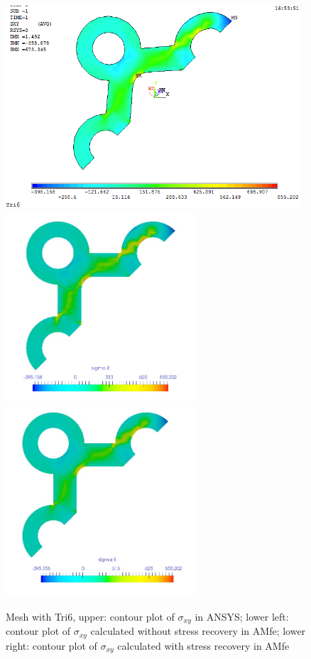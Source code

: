 \begin{figure}[htbp]
	\begin{center}
		\includegraphics[width=11cm,clip]{Tri6_Sxy.png} 		
		\includegraphics[width=7cm,clip]{Tri6_Sxy_PD.png} 		
		\includegraphics[width=7cm,clip]{Tri6_Sxy_P.png} 		
		\caption{Mesh with Tri6, upper: contour plot of $\sigma_{xy}$ in ANSYS; lower left: contour plot of $\sigma_{xy}$ calculated without stress recovery in AMfe; lower right: contour plot of $\sigma_{xy}$ calculated with stress recovery in AMfe} \label{fig: Tri6_Sxy}
	\end{center}
\end{figure}
\clearpage 


